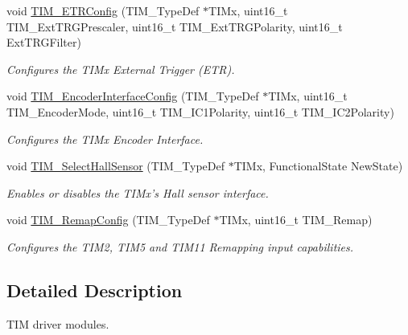 \begin{DoxyCompactItemize}
void \hyperlink{group___t_i_m_ga8bdde400b7a30f3e747fe8e4962c0abe}{T\-I\-M\-\_\-\-E\-T\-R\-Config} (T\-I\-M\-\_\-\-Type\-Def $\ast$T\-I\-Mx, uint16\-\_\-t T\-I\-M\-\_\-\-Ext\-T\-R\-G\-Prescaler, uint16\-\_\-t T\-I\-M\-\_\-\-Ext\-T\-R\-G\-Polarity, uint16\-\_\-t Ext\-T\-R\-G\-Filter)
\begin{DoxyCompactList}\small\item\em Configures the T\-I\-Mx External Trigger (E\-T\-R). \end{DoxyCompactList}\item 
void \hyperlink{group___t_i_m_ga0fc7e76c47a3bd1ba1ebc71427832b51}{T\-I\-M\-\_\-\-Encoder\-Interface\-Config} (T\-I\-M\-\_\-\-Type\-Def $\ast$T\-I\-Mx, uint16\-\_\-t T\-I\-M\-\_\-\-Encoder\-Mode, uint16\-\_\-t T\-I\-M\-\_\-\-I\-C1\-Polarity, uint16\-\_\-t T\-I\-M\-\_\-\-I\-C2\-Polarity)
\begin{DoxyCompactList}\small\item\em Configures the T\-I\-Mx Encoder Interface. \end{DoxyCompactList}\item 
void \hyperlink{group___t_i_m_ga42c2d1025a3937c9d9f38631af86ffa4}{T\-I\-M\-\_\-\-Select\-Hall\-Sensor} (T\-I\-M\-\_\-\-Type\-Def $\ast$T\-I\-Mx, Functional\-State New\-State)
\begin{DoxyCompactList}\small\item\em Enables or disables the T\-I\-Mx's Hall sensor interface. \end{DoxyCompactList}\item 
void \hyperlink{group___t_i_m_ga08ffb6f2bfa96b6fbcbb8d8001cb8ba9}{T\-I\-M\-\_\-\-Remap\-Config} (T\-I\-M\-\_\-\-Type\-Def $\ast$T\-I\-Mx, uint16\-\_\-t T\-I\-M\-\_\-\-Remap)
\begin{DoxyCompactList}\small\item\em Configures the T\-I\-M2, T\-I\-M5 and T\-I\-M11 Remapping input capabilities. \end{DoxyCompactList}\end{DoxyCompactItemize}


\subsection{Detailed Description}
T\-I\-M driver modules. 

